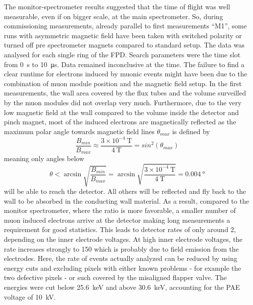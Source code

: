   The monitor-spectrometer results suggested that the time of flight was well measurable, even if on bigger scale, at the main spectrometer. So, during commissioning measurements, already parallel to first measurements ``M1'', some runs with asymmetric magnetic field have been taken with switched polarity or turned off pre spectrometer magnets compared to standard setup.
  The data was analysed for each single ring of the FPD. Search parameters were the time slot from \SI{0}{\second} to \SI{10}{\micro\second}. Data remained inconclusive at the time. 
  The failure to find a clear runtime for electrons induced by muonic events might have been due to the combination of muon module position and the magnetic field setup. In the first measurements, the wall area covered by the flux tubes and the volume surveilled by the muon modules did not overlap very much. Furthermore, due to the very low magnetic field at the wall compared to the volume inside the detector and pinch magnet, most of the induced electrons are magnetically reflected as the maximum polar angle towards magnetic field lines $\theta_{max}$ is defined by
  \begin{equation}
  	\frac{B_{min}}{B_{max}} \approx \frac{3\times 10^{-4}~\text{T}}{\SI{4}{\tesla}} = sin^2(\theta_{max})
  \end{equation}
  meaning only angles below
  \begin{equation}
  	\theta < \arcsin{\sqrt{\frac{B_{min}}{B_{max}}}} = \arcsin{\sqrt{\frac{3\times 10^{-4}~\text{T}}{\SI{4}{\tesla}}}} = \SI{0.004}{\degree}
  \end{equation}
	will be able to reach the detector. All others will be reflected and fly back to the wall to be absorbed in the conducting wall material.
	As a result, compared to the monitor spectrometer, where the ratio is more favorable, a smaller number of muon induced electrons arrive at the detector making long measurements a requirement for good statistics. This leads to detector rates of only around \SI{2}{\cps}, depending on the inner electrode voltages.
	At high inner electrode voltages, the rate increases strongly to \SI{150}{\cps} which is probably due to field emission from the electrodes. Here, the rate of events actually analyzed can be reduced by using energy cuts and excluding pixels with either known problems - for example the two defective pixels - or such covered by the misaligned flapper valve. The energies were cut below \SI{25.6}{\kilo\electronvolt} and above \SI{30.6}{\kilo\electronvolt}, accounting for the PAE voltage of \SI{10}{\kilo\volt}.
  
